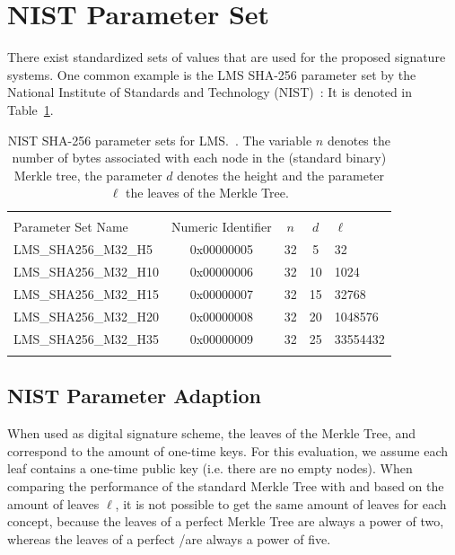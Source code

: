 \section{NIST Parameter Set}
There exist standardized sets of values that are used for the proposed signature systems. One common example is the LMS SHA-256 parameter set by the National Institute of Standards and Technology (NIST)~\cite{stateful_hashbased_sign_schemes_NIST_2020}: It is denoted in Table~\ref{table:nist_param_lms}. 

\begin{table}
\centering
\begin{tabular}{l c c c l} 
 \hline\noalign{\smallskip}
 \multicolumn{5}{c}{\textbf{NIST Parameter Set, LMS}} \\
 Parameter Set Name & Numeric Identifier & $n$ & $d$ & $\ell$\\
 \hline\noalign{\smallskip}
 LMS\_SHA256\_M32\_H5 & 0x00000005  & 32 & 5 & 32 \\
 LMS\_SHA256\_M32\_H10 & 0x00000006  & 32 & 10 & 1024 \\
 LMS\_SHA256\_M32\_H15 & 0x00000007  & 32 & 15 & 32768 \\
 LMS\_SHA256\_M32\_H20 & 0x00000008  & 32 & 20 & 1048576 \\
 LMS\_SHA256\_M32\_H35 & 0x00000009  & 32 & 25 & 33554432 \\
 \hline\noalign{\smallskip}
 \end{tabular}
\caption{NIST SHA-256 parameter sets for LMS.~\cite{stateful_hashbased_sign_schemes_NIST_2020}. The variable $n$ denotes the number of bytes associated with each node in the (standard binary) Merkle tree, the parameter $d$ denotes the height and the parameter $\ell$ the leaves of the Merkle Tree.}
\label{table:nist_param_lms}
\end{table}

\subsection{NIST Parameter Adaption}
\label{sec:nist_param_to_leaves}
When used as digital signature scheme, the leaves of the Merkle Tree, \tftree and \extree correspond to the amount of one-time keys. For this evaluation, we assume each leaf contains a one-time public key (i.e. there are no empty nodes). When comparing the performance of the standard Merkle Tree with \tftree and \extree based on the amount of leaves $\ell$, it is not possible to get the same amount of leaves for each concept, because the leaves of a perfect Merkle Tree are always a power of two, whereas the leaves of a perfect \tftree\xspace/\xspace\extree are always a power of five. 
 
